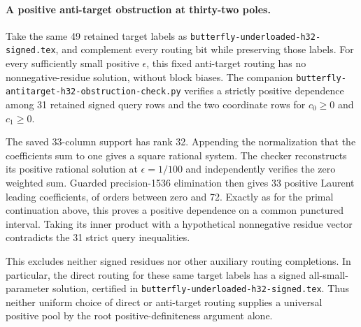 \documentclass[11pt]{article}
\begin{document}
\paragraph{A positive anti-target obstruction at thirty-two poles.}
Take the same 49 retained target labels as
\texttt{butterfly-underloaded-h32-signed.tex}, and complement every
routing bit while preserving those labels. For every sufficiently
small positive $\epsilon$, this fixed anti-target routing has no
nonnegative-residue solution, without block biases. The companion
\texttt{butterfly-antitarget-h32-obstruction-check.py} verifies a
strictly positive dependence among 31 retained signed query rows and
the two coordinate rows for $c_0\geq0$ and $c_1\geq0$.

The saved 33-column support has rank 32. Appending the normalization
that the coefficients sum to one gives a square rational system.
The checker reconstructs its positive rational solution at
$\epsilon=1/100$ and independently verifies the zero weighted sum.
Guarded precision-1536 elimination then gives 33 positive Laurent
leading coefficients, of orders between zero and 72. Exactly as for
the primal continuation above, this proves a positive dependence
on a common punctured interval. Taking its inner product with a
hypothetical nonnegative residue vector contradicts the 31 strict
query inequalities.

This excludes neither signed residues nor other auxiliary routing
completions. In particular, the direct routing for these same target
labels has a signed all-small-parameter solution, certified in
\texttt{butterfly-underloaded-h32-signed.tex}. Thus neither uniform
choice of direct or anti-target routing supplies a universal positive
pool by the root positive-definiteness argument alone.
\end{document}
